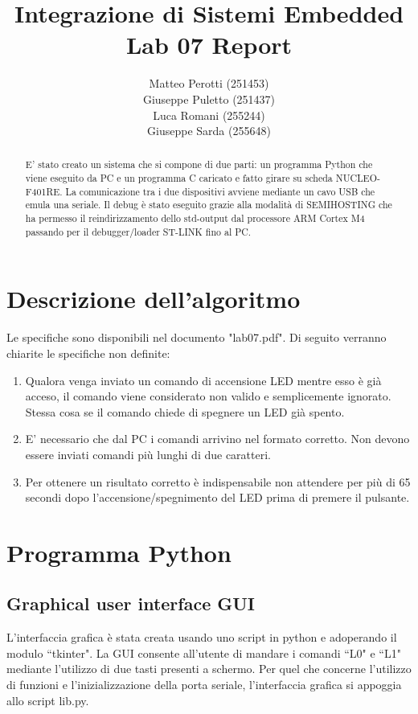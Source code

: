 \documentclass[a4paper]{article}
\title{Integrazione di Sistemi Embedded\\Lab 07 Report}
\author{Matteo Perotti (251453)\\Giuseppe Puletto (251437)\\Luca Romani (255244)\\Giuseppe Sarda (255648)}
\begin{document}
\maketitle

\newpage

\begin{abstract}
	E' stato creato un sistema che si compone di due parti: un programma Python che viene eseguito da PC e un programma C caricato e fatto girare su scheda NUCLEO-F401RE. La comunicazione tra i due dispositivi avviene mediante un cavo USB che emula una seriale. 
	Il debug è stato eseguito grazie alla modalità di SEMIHOSTING che ha permesso il reindirizzamento dello std-output dal processore ARM Cortex M4 passando per il debugger/loader ST-LINK fino al PC.
\end{abstract}

\section{Descrizione dell'algoritmo}
Le specifiche sono disponibili nel documento "lab07.pdf". Di seguito verranno chiarite le specifiche non definite:
\begin{enumerate}
	\item Qualora venga inviato un comando di accensione LED mentre esso è già acceso, il comando viene considerato non valido e semplicemente ignorato. Stessa cosa se il comando chiede di spegnere un LED già spento.
	\item E' necessario che dal PC i comandi arrivino nel formato corretto. Non devono essere inviati comandi più lunghi di due caratteri.
	\item Per ottenere un risultato corretto è indispensabile non attendere per più di 65 secondi dopo l'accensione/spegnimento del LED prima di premere il pulsante.
\end{enumerate}

\section{Programma Python}
\subsection{Graphical user interface GUI}
L'interfaccia grafica è stata creata usando uno script in python e adoperando il modulo ``tkinter". La GUI consente all'utente di mandare i comandi ``L0" e ``L1" mediante l'utilizzo di due tasti presenti a schermo. Per quel che concerne l'utilizzo di funzioni e l'inizializzazione della porta seriale, l'interfaccia grafica si appoggia allo script lib.py.
\end{document}
